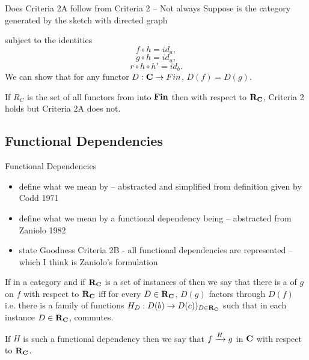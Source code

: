 \documentclass[xcolor=pst,dvips]{beamer}   %
\begin{document}
\begin{frame}{Does Criteria 2A follow from Criteria 2 -- Not always}
Suppose \catcw is the category generated by the sketch with directed graph

subject to the identities
\begin{equation}
\label{fhidentity}
f \circ h = id_a,
\end{equation}
\begin{equation}
\label{ghidentity}
g \circ h = id_a,
\end{equation}
\begin{equation}
\label{rhhpidentity}
r \circ h \circ h' = id_b.
\end{equation}
We can show that for any functor $D:\catc \morph Fin$, $D(f)=D(g)$. 

If $R_C$ is the set of all functors from \catcw into $\Fin$ then with respect to $\reqtc$, Criteria 2 holds but Criteria 2A does not.
\end{frame}

\subsection{Functional Dependencies}
\begin{frame}{Functional Dependencies}
\begin{itemize}
\item define what we mean by 
-- abstracted and simplified from definition given by Codd 1971
\item define what we mean by a functional dependency being 
-- abstracted from Zaniolo 1982
\item state Goodness Criteria 2B - all functional dependencies are represented -- which I think is Zaniolo's formulation 
\end{itemize}
\end{frame}

\begin{frame}
\begin{definition}
If \fgsourcediag in a category \catcw  and if $\reqtc$ is a set of instances of \catcw
then we say that there is a   of $g$ on $f$ with respect to $\reqtc$ iff
for every $D \in \reqtc$, $D(g)$ factors through $D(f)$ \\
\medskip
i.e. there is a family of functions $H_D:D(b) \morph D(c))_{D \in \reqtc}$
such that in each instance $D \in \reqtc$,
 commutes.
\end{definition}

If $H$ is such a functional dependency then we say that $\fundep{H}{f}{g}$ in $\catc$ with respect to $\reqtc$.
\end{frame}
\end{document}
